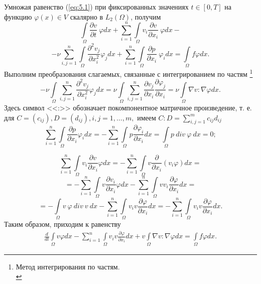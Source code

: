 Умножая равенство (\ref{eq:5.1}) при фиксированных значениях $t\in [0, T]$ на функцию $\varphi (x)\in V$ скалярно в $L_2(\Omega)$, получим
$$\int\limits_\Omega \frac{\partial v}{\partial t}\ \varphi dx+\sum_{i=1}^n\int\limits_\Omega v_i\frac{\partial v}{\partial x_i}\ \varphi dx-$$
$$-\nu \sum_{i, j=1}^n\int\limits_\Omega\frac{\partial^2 v_j}{\partial x^{2}_i} \varphi_j dx+
\sum_{i=1}^n\int\limits_\Omega \frac{\partial p}{\partial x_i}\ \varphi_idx=\int\limits_\Omega f\varphi dx.$$
Выполним преобразования слагаемых, связанные с интегрированием по частям
\footnote{Метод интегрирования по частям.\\}
$$-\nu\int\limits_\Omega \sum_{i,j=1}^{n}\frac{\partial^2 v_j}{\partial x^{2}_i}\varphi_j dx=
\nu\int\limits_\Omega\sum_{i, j=1}^{n}\frac{\partial v_j}{\partial x_i}\frac{\partial \varphi_j}{\partial x_i}=\nu\int\limits_\Omega \nabla v:\nabla\varphi dx.$$
Здесь символ <<:>> обозначает покомпонентное матричное произведение, т. е. для $ C=(c_{ij}), D=(d_{ij}), i, j=1,\ldots,m,$ имеем $C:D=\sum\limits_{i,j=1}^{m} c_{ij}d_{ij}$
$$\sum_{i=1}^{n}\int\limits_\Omega \frac{\partial p}{\partial x_i}\varphi_i dx
=-\sum_{i=1}^{n}\int\limits_\Omega p\frac{\partial \varphi_i}{\partial x_i}dx= \int\limits_\Omega p \ div \ \varphi \ dx=0;$$

$$\sum_{i=1}^{n}\int\limits_\Omega v_i\frac{\partial v}{\partial x_i}\varphi dx=-\sum_{i=1}^{n}\int\limits_\Omega v\frac{\partial}{\partial x_i}(v_i\varphi)dx=$$
$$=-\sum_{i=1}^{n}\int\limits_\Omega v\frac{\partial v_i}{\partial x_i}\varphi dx-\sum_{i=1}^{n}\int\limits_\Omega vv_i\frac{\partial\varphi}{\partial x_i} dx=$$
$$=-\int\limits_\Omega v \ \varphi \ div \ v \ dx-\sum_{i=1}^{n}\int\limits_\Omega v_i v\frac{\partial\varphi}{\partial x_i}dx=
-\sum_{i=1}^{n}\int\limits_\Omega v_i v\frac{\partial\varphi}{\partial x_i}dx.$$
Таким образом, приходим к равенству
\begin{equation}\label{eq:5.5}
    \begin{gathered}
        \frac{d}{dt}\int\limits_\Omega v \varphi dx-\sum_{i=1}^{n}\int\limits_\Omega v_i v
        \frac{\partial \varphi }{\partial x_i}dx + v\int\limits_\Omega \nabla v :\nabla\varphi dx
        =\int\limits_\Omega f\varphi dx.
    \end{gathered}
\end{equation}

